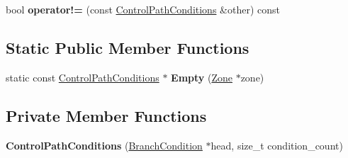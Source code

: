 \begin{DoxyCompactItemize}
\item 
bool {\bfseries operator!=} (const \hyperlink{classv8_1_1internal_1_1compiler_1_1_branch_elimination_1_1_control_path_conditions}{Control\+Path\+Conditions} \&other) const \hypertarget{classv8_1_1internal_1_1compiler_1_1_branch_elimination_1_1_control_path_conditions_a58ed5d1f201c5800dbe9f78ab20b9b54}{}\label{classv8_1_1internal_1_1compiler_1_1_branch_elimination_1_1_control_path_conditions_a58ed5d1f201c5800dbe9f78ab20b9b54}

\end{DoxyCompactItemize}
\subsection*{Static Public Member Functions}
\begin{DoxyCompactItemize}
\item 
static const \hyperlink{classv8_1_1internal_1_1compiler_1_1_branch_elimination_1_1_control_path_conditions}{Control\+Path\+Conditions} $\ast$ {\bfseries Empty} (\hyperlink{classv8_1_1internal_1_1_zone}{Zone} $\ast$zone)\hypertarget{classv8_1_1internal_1_1compiler_1_1_branch_elimination_1_1_control_path_conditions_a577bca540ae8e127ac12c4f58bc68dfd}{}\label{classv8_1_1internal_1_1compiler_1_1_branch_elimination_1_1_control_path_conditions_a577bca540ae8e127ac12c4f58bc68dfd}

\end{DoxyCompactItemize}
\subsection*{Private Member Functions}
\begin{DoxyCompactItemize}
\item 
{\bfseries Control\+Path\+Conditions} (\hyperlink{structv8_1_1internal_1_1compiler_1_1_branch_elimination_1_1_branch_condition}{Branch\+Condition} $\ast$head, size\+\_\+t condition\+\_\+count)\hypertarget{classv8_1_1internal_1_1compiler_1_1_branch_elimination_1_1_control_path_conditions_a393e3dbea54fe4b41c8d6950d3de8830}{}\label{classv8_1_1internal_1_1compiler_1_1_branch_elimination_1_1_control_path_conditions_a393e3dbea54fe4b41c8d6950d3de8830}

\end{DoxyCompactItemize}
